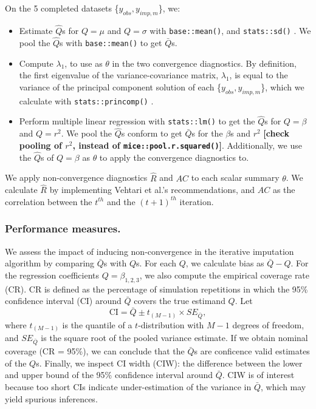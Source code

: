 \documentclass[Royal,times,sageh]{sagej}
\begin{document}
On the 5 completed datasets \{\(y_{obs}, y_{imp, m}\)\}, we:

\begin{itemize}
\item
  Estimate \(\hat{Q}\)s for \(Q= \mu\) and \(Q=\sigma\) with \texttt{base::mean()}, and \texttt{stats::sd()} \citep{R}. We pool the \(\hat{Q}\)s with \texttt{base::mean()} to get \(\bar{Q}\)s.
\item
  Compute \(\lambda_1\), to use as \(\theta\) in the two convergence diagnostics. By definition, the first eigenvalue of the variance-covariance matrix, \(\lambda_1\), is equal to the variance of the principal component solution of each \{\(y_{obs}, y_{imp, m}\)\}, which we calculate with \texttt{stats::princomp()} \citep{R}.
\item
  Perform multiple linear regression with \texttt{stats::lm()} \citep{R} to get the \(\hat{Q}\)s for \(Q=\beta\) and \(Q=r^2\). We pool the \(\hat{Q}\)s conform \citet{vink14} to get \(\bar{Q}\)s for the \(\beta\)s and \(r^2\) \textbf{{[}check pooling of \(r^2\), instead of \texttt{mice::pool.r.squared()}{]}}. Additionally, we use the \(\hat{Q}\)s of \(Q=\beta\) as \(\theta\) to apply the convergence diagnostics to.
\end{itemize}

We apply non-convergence diagnostics \(\widehat{R}\) and \(AC\) to each scalar summary \(\theta\). We calculate \(\widehat{R}\) by implementing Vehtari et al.'s \citeyearpar{veht19} recommendations, and \(AC\) as the correlation between the \(t^{th}\) and the \((t+1)^{th}\) iteration.

\hypertarget{performance-measures.}{%
\subsubsection{Performance measures.}\label{performance-measures.}}

We assess the impact of inducing non-convergence in the iterative imputation algorithm by comparing \(\bar{Q}\)s with \(Q\)s. For each \(Q\), we calculate bias as \(\bar{Q} - Q\). For the regression coefficients \(Q=\beta_{1,2,3}\), we also compute the empirical coverage rate (CR). CR is defined as the percentage of simulation repetitions in which the 95\% confidence interval (CI) around \(\bar{Q}\) covers the true estimand \(Q\). Let
\[\text{CI} = \bar{Q} \pm t_{(M-1)} \times SE_{\bar{Q}},\]
where \(t_{(M-1)}\) is the quantile of a \(t\)-distribution with \(M-1\) degrees of freedom, and \(SE_{\bar{Q}}\) is the square root of the pooled variance estimate. If we obtain nominal coverage (CR = 95\%), we can conclude that the \(\bar{Q}\)s are conficence valid estimates of the \(Q\)s. Finally, we inspect CI width (CIW): the difference between the lower and upper bound of the 95\% confidence interval around \(\bar{Q}\). CIW is of interest because too short CIs indicate under-estimation of the variance in \(\bar{Q}\), which may yield spurious inferences.
\end{document}
